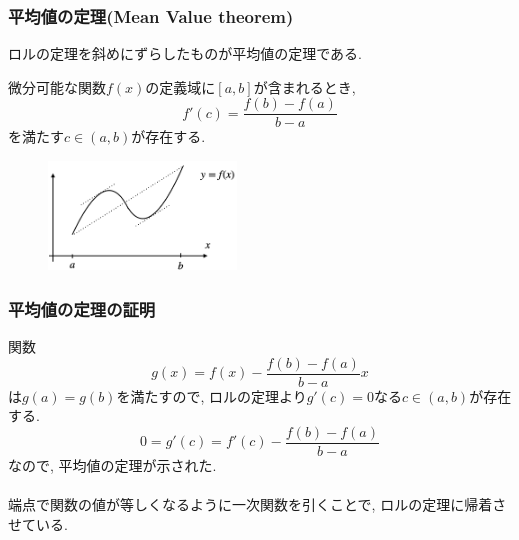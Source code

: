 \begin{frame}
\frametitle{平均値の定理(Mean Value theorem)}

ロルの定理を斜めにずらしたものが平均値の定理である. 

\begin{Thm}[平均値の定理]
微分可能な関数$f(x)$の定義域に$[a,b]$が含まれるとき,
$$
f'(c)=\frac{f(b)-f(a)}{b-a}
$$
を満たす$c \in (a,b)$が存在する. 
\end{Thm}

 \begin{figure}[htbp]
 \begin{center} 
  \includegraphics[width=50mm]{calculus8/Mean.png}
 \end{center}
\end{figure}

\end{frame}








\begin{frame}
\frametitle{平均値の定理の証明}


関数 
$$
g(x)=f(x)-\frac{f(b)-f(a)}{b-a}x
$$
は$g(a)=g(b)$を満たすので, ロルの定理より$g'(c)=0$なる$c \in (a,b)$が存在する. 
$$
0=g'(c)=f'(c)-\frac{f(b)-f(a)}{b-a}
$$
なので, 平均値の定理が示された. \\
\ \\

端点で関数の値が等しくなるように一次関数を引くことで, ロルの定理に帰着させている. 

\end{frame}







